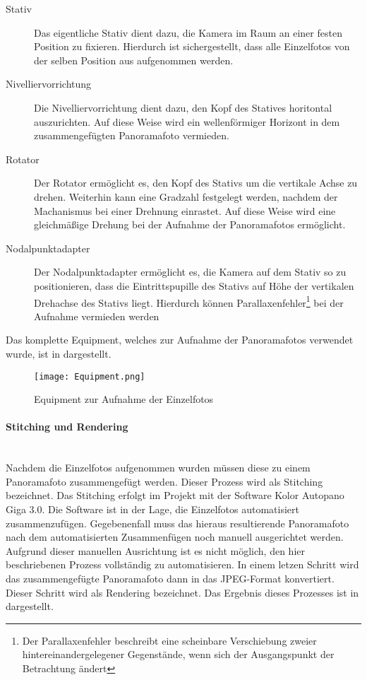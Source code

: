 \begin{description}
\item[Stativ] Das eigentliche Stativ dient dazu, die Kamera im Raum an einer
festen Position zu fixieren. Hierdurch ist sichergestellt, dass alle
Einzelfotos von der selben Position aus aufgenommen werden.
\item[Nivelliervorrichtung] Die Nivelliervorrichtung dient dazu, den Kopf des
Statives horitontal auszurichten. Auf diese Weise wird ein wellenförmiger
Horizont in dem zusammengefügten Panoramafoto vermieden.
\item[Rotator] Der Rotator ermöglicht es, den Kopf des Stativs um die vertikale
Achse zu drehen. Weiterhin kann eine Gradzahl festgelegt werden, nachdem der
Machanismus bei einer Drehnung einrastet. Auf diese Weise wird eine gleichmäßige
Drehung bei der Aufnahme der Panoramafotos ermöglicht.
\item[Nodalpunktadapter] Der Nodalpunktadapter ermöglicht es, die Kamera auf
dem Stativ so zu positionieren, dass die Eintrittspupille des Stativs auf Höhe
der vertikalen Drehachse des Stativs liegt. Hierdurch können
Parallaxenfehler\footnote{Der Parallaxenfehler beschreibt eine scheinbare
Verschiebung zweier hintereinandergelegener Gegenstände, wenn sich der
Ausgangspunkt der Betrachtung ändert} bei der Aufnahme vermieden werden
\end{description}

Das komplette Equipment, welches zur Aufnahme der Panoramafotos verwendet wurde,
ist in  dargestellt.

\begin{figure}[htb]
\centering
\texttt{[image: Equipment.png]}
\caption[Equipment zur Aufnahme der Einzelfotos]{Equipment zur Aufnahme der Einzelfotos\protect\footnotemark}
\label{fig:Equipment}
\end{figure}

\paragraph{Stitching und Rendering} \hfill \\

Nachdem die Einzelfotos aufgenommen wurden müssen diese zu einem Panoramafoto
zusammengefügt werden. Dieser Prozess wird als Stitching bezeichnet. Das
Stitching erfolgt im Projekt mit der Software Kolor Autopano Giga 3.0. Die
Software ist in der Lage, die Einzelfotos automatisiert zusammenzufügen.
Gegebenenfall muss das hieraus resultierende Panoramafoto nach dem
automatisierten Zusammenfügen noch manuell ausgerichtet werden. Aufgrund
dieser manuellen Ausrichtung ist es nicht möglich, den hier beschriebenen
Prozess vollständig zu automatisieren. In einem letzen Schritt wird das
zusammengefügte Panoramafoto dann in das JPEG-Format konvertiert. Dieser Schritt
wird als Rendering bezeichnet. Das Ergebnis dieses Prozesses ist in
 dargestellt.

